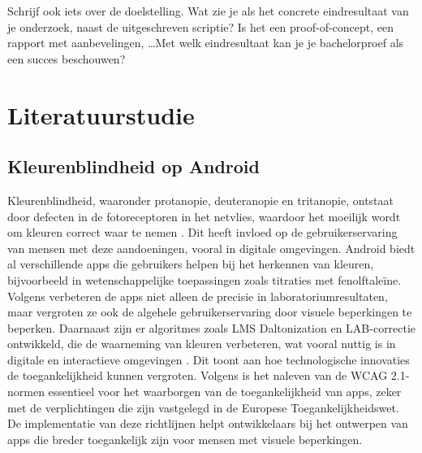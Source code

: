 Schrijf ook iets over de doelstelling. Wat zie je als het concrete eindresultaat van je onderzoek, naast de uitgeschreven scriptie? Is het een proof-of-concept, een rapport met aanbevelingen, \ldots Met welk eindresultaat kan je je bachelorproef als een succes beschouwen?


\section{Literatuurstudie}%
\label{sec:literatuurstudie}

\subsection{Kleurenblindheid op Android}
Kleurenblindheid, waaronder protanopie, deuteranopie en tritanopie, ontstaat door defecten in de 
fotoreceptoren in het netvlies, waardoor het moeilijk wordt om kleuren correct waar te nemen \autocite{Salih2020}. 
Dit heeft invloed op de gebruikerservaring van mensen met deze aandoeningen, vooral in digitale omgevingen. 
Android biedt al verschillende apps die gebruikers helpen bij het herkennen van kleuren, bijvoorbeeld 
in wetenschappelijke toepassingen zoals titraties met fenolftaleïne. Volgens \textcite{Bandyopadhyay2017} verbeteren 
de apps niet alleen de precisie in laboratoriumresultaten, maar vergroten ze ook de algehele gebruikerservaring 
door visuele beperkingen te beperken. Daarnaast zijn er algoritmes zoals LMS Daltonization en LAB-correctie 
ontwikkeld, die de waarneming van kleuren verbeteren, wat vooral nuttig is in digitale en interactieve 
omgevingen \autocite{Baswaraju2020}. Dit toont aan hoe technologische innovaties de toegankelijkheid kunnen vergroten. 
Volgens \textcite{Crawford2024} is het naleven van de WCAG 2.1-normen essentieel voor het waarborgen van de 
toegankelijkheid van apps, zeker met de verplichtingen die zijn vastgelegd in de Europese Toegankelijkheidswet.
De implementatie van deze richtlijnen helpt ontwikkelaars bij het ontwerpen van apps die breder toegankelijk
zijn voor mensen met visuele beperkingen.
